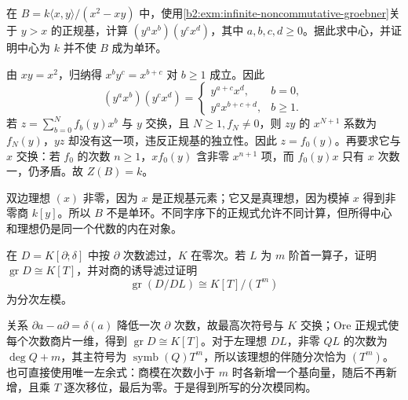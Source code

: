 \begin{optionalexercise}\label{b2:ex:20-groebner-order-dependence}
	在 \(B=k\langle x,y\rangle/(x^2-xy)\) 中，使用\cref{b2:exm:infinite-noncommutative-groebner}关于 \(y>x\) 的正规基，计算 \((y^ax^b)(y^cx^d)\)，其中 \(a,b,c,d\ge0\)。据此求中心，并证明中心为 \(k\) 并不使 \(B\) 成为单环。
\end{optionalexercise}
\begin{solution}
	由 \(xy=x^2\)，归纳得 \(x^by^c=x^{b+c}\) 对 \(b\ge1\) 成立。因此
	\[
		(y^ax^b)(y^cx^d)=
		\begin{cases}
			y^{a+c}x^d,&b=0,\\
			y^ax^{b+c+d},&b\ge1.
		\end{cases}
	\]
	若 \(z=\sum_{b=0}^Nf_b(y)x^b\) 与 \(y\) 交换，且 \(N\ge1,f_N\ne0\)，则 \(zy\) 的 \(x^{N+1}\) 系数为 \(f_N(y)\)，\(yz\) 却没有这一项，违反正规基的独立性。因此 \(z=f_0(y)\)。再要求它与 \(x\) 交换：若 \(f_0\) 的次数 \(n\ge1\)，\(xf_0(y)\) 含非零 \(x^{n+1}\) 项，而 \(f_0(y)x\) 只有 \(x\) 次数一，仍矛盾。故 \(Z(B)=k\)。

	双边理想 \((x)\) 非零，因为 \(x\) 是正规基元素；它又是真理想，因为模掉 \(x\) 得到非零商 \(k[y]\)。所以 \(B\) 不是单环。不同字序下的正规式允许不同计算，但所得中心和理想仍是同一个代数的内在对象。
\end{solution}

\begin{optionalexercise}\label{b2:ex:20-differential-associated-module}
	在 \(D=K[\partial;\delta]\) 中按 \(\partial\) 次数滤过，\(K\) 在零次。若 \(L\) 为 \(m\) 阶首一算子，证明 \(\operatorname{gr}D\cong K[T]\)，并对商的诱导滤过证明
	\[
		\operatorname{gr}(D/DL)\cong K[T]/(T^m)
	\]
	为分次左模。
\end{optionalexercise}
\begin{solution}
	关系 \(\partial a-a\partial=\delta(a)\) 降低一次 \(\partial\) 次数，故最高次符号与 \(K\) 交换；Ore 正规式使每个次数商片一维，得到 \(\operatorname{gr}D\cong K[T]\)。对于左理想 \(DL\)，非零 \(QL\) 的次数为 \(\deg Q+m\)，其主符号为 \(\operatorname{symb}(Q)T^m\)，所以该理想的伴随分次恰为 \((T^m)\)。也可直接使用唯一左余式：商模在次数小于 \(m\) 时各新增一个基向量，随后不再新增，且乘 \(T\) 逐次移位，最后为零。于是得到所写的分次模同构。
\end{solution}

